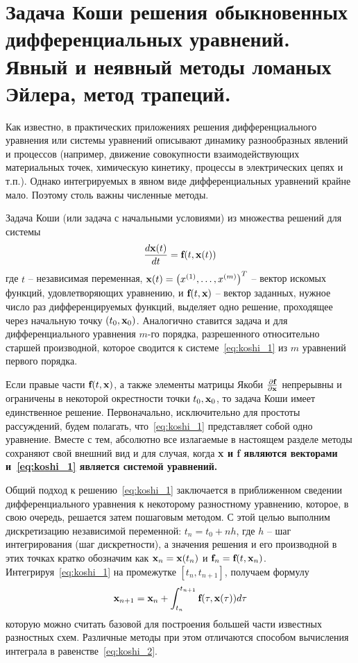 \section{Задача Коши решения обыкновенных дифференциальных уравнений. Явный и неявный методы ломаных Эйлера, метод трапеций.}\label{sec:ch24}
Как известно, в практических приложениях решения дифференциального уравнения или системы уравнений описывают
динамику разнообразных явлений и процессов (например, движение совокупности взаимодействующих материальных точек,
химическую кинетику, процессы в электрических цепях и т.п.). Однако интегрируемых в явном виде дифференциальных
уравнений крайне мало. Поэтому столь важны численные методы.

Задача Коши (или задача с начальными условиями) из множества решений для системы
\begin{equation}
    \frac{d\bf{x}(t)}{dt} = \bf{f}(t, \bf{x}(t)) \label{eq:koshi_1}
\end{equation}
где $t$ -- независимая переменная, $\bf{x}(t) = \left( x^{(1)}, \ldots, x^{(m)} \right)^T$ -- вектор искомых функций,
удовлетворяющих уравнению, и $\bf{f}(t, \bf{x})$ -- вектор заданных, нужное число раз дифференцируемых функций,
выделяет одно решение, проходящее через начальную точку $(t_0, \bf{x}_0)$. Аналогично ставится задача и для
дифференциального уравнения $m$-го порядка, разрешенного относительно старшей производной, которое сводится к
системе~\eqref{eq:koshi_1} из $m$ уравнений первого порядка.

Если правые части $\bf{f}(t, \bf{x})$, а также элементы матрицы Якоби $\frac{\partial \bf{f}}{\partial \bf{x}}$
непрерывны и ограничены в некоторой окрестности точки $t_0, \bf{x}_0$, то задача Коши имеет единственное решение.
Первоначально, исключительно для простоты рассуждений, будем полагать, что~\eqref{eq:koshi_1} представляет собой
одно уравнение. Вместе с тем, абсолютно все излагаемые в настоящем разделе методы сохраняют свой внешний вид и для
случая, когда \bf{x} и \bf{f} являются векторами и~\eqref{eq:koshi_1} является системой уравнений.

Общий подход к решению~\eqref{eq:koshi_1} заключается в приближенном сведении дифференциального уравнения к
некоторому разностному уравнению, которое, в свою очередь, решается затем пошаговым методом. С этой целью
выполним дискретизацию независимой переменной: $t_n = t_0 + nh$, где $h$ -- шаг интегрирования (шаг дискретности), а
значения решения и его производной в этих точках кратко обозначим как $\bf{x}_n = \bf{x}(t_n)$ и $\bf{f}_n = \bf{f}(t, \bf{x}_n)$.
Интегрируя~\eqref{eq:koshi_1} на промежутке $[t_n, t_{n+1}]$, получаем формулу
\begin{equation}
    \bf{x}_{n+1} = \bf{x}_n + \int_{t_n}^{t_{n+1}} \bf{f}(\tau, \bf{x}(\tau))d\tau \label{eq:koshi_2}
\end{equation}
которую можно считать базовой для построения большей части известных разностных схем. Различные методы при этом
отличаются способом вычисления интеграла в равенстве~\eqref{eq:koshi_2}.


